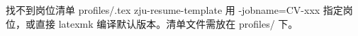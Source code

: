 \documentclass[10pt]{article}
\begin{document}

  {}
  {\GenericError{}
    {找不到岗位清单 profiles/\jobname.tex}
    {zju-resume-template}
    {用 -jobname=CV-xxx 指定岗位，或直接 latexmk 编译默认版本。清单文件需放在 profiles/ 下。}}
\end{document}
